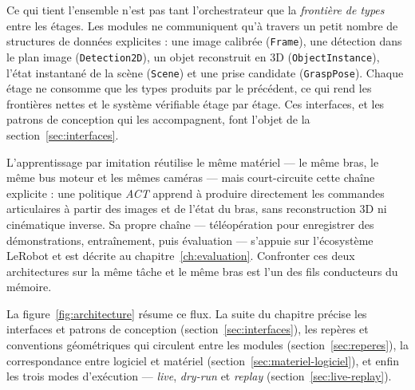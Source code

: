 Ce qui tient l'ensemble n'est pas tant l'orchestrateur que la \emph{frontière de types} entre les étages. Les modules ne communiquent qu'à travers un petit nombre de structures de données explicites : une image calibrée (\texttt{Frame}), une détection dans le plan image (\texttt{Detection2D}), un objet reconstruit en 3D (\texttt{ObjectInstance}), l'état instantané de la scène (\texttt{Scene}) et une prise candidate (\texttt{GraspPose}). Chaque étage ne consomme que les types produits par le précédent, ce qui rend les frontières nettes et le système vérifiable étage par étage. Ces interfaces, et les patrons de conception qui les accompagnent, font l'objet de la section~\ref{sec:interfaces}.

L'apprentissage par imitation réutilise le même matériel --- le même bras, le même bus moteur et les mêmes caméras --- mais court-circuite cette chaîne explicite : une politique \emph{ACT} apprend à produire directement les commandes articulaires à partir des images et de l'état du bras, sans reconstruction 3D ni cinématique inverse. Sa propre chaîne --- téléopération pour enregistrer des démonstrations, entraînement, puis évaluation --- s'appuie sur l'écosystème LeRobot et est décrite au chapitre~\ref{ch:evaluation}. Confronter ces deux architectures sur la même tâche et le même bras est l'un des fils conducteurs du mémoire.

La figure~\ref{fig:architecture} résume ce flux. La suite du chapitre précise les interfaces et patrons de conception (section~\ref{sec:interfaces}), les repères et conventions géométriques qui circulent entre les modules (section~\ref{sec:reperes}), la correspondance entre logiciel et matériel (section~\ref{sec:materiel-logiciel}), et enfin les trois modes d'exécution --- \emph{live}, \emph{dry-run} et \emph{replay} (section~\ref{sec:live-replay}).


